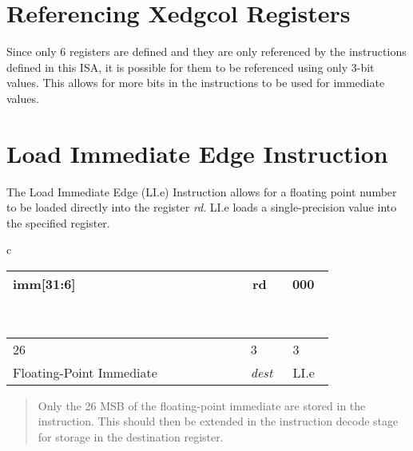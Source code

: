 \section{Referencing Xedgcol Registers}
Since only 6 registers are defined and they are only referenced by the instructions defined in this ISA, it is possible for them to be referenced using only 3-bit values. This allows for more bits in the instructions to be used for immediate values.

\section{Load Immediate Edge Instruction}
The Load Immediate Edge (LI.e) Instruction allows for a floating point number to be loaded directly into the register \textit{rd}. LI.e loads a single-precision value into the specified register.

\begin{table}[H]
\begin{centering}
\begin{tabular}{c}
    \begin{tabular}{|m{0.6\linewidth}|m{0.1\linewidth}|m{0.1\linewidth}|}
    \hline
    \hspace*{3.5cm} imm[31:6]  &  \hspace*{0.5cm}rd &  \hspace*{0.5cm}000 \\
    \hline
    \end{tabular} \\

    \begin{tabular}{m{0.6\linewidth}m{0.1\linewidth}m{0.1\linewidth}}
    \hspace*{3.85cm}  26 &  \hspace*{0.5cm} 3 &  \hspace*{0.5cm} 3 \\
    \hspace*{2.7cm}  Floating-Point Immediate &  \hspace*{0.4cm}\textit{dest} &  \hspace*{0.4cm}LI.e \\
    \end{tabular}
\end{tabular}
\end{centering}
\end{table}

\begin{quote}{}
    Only the 26 \gls{MSB} of the floating-point immediate are stored in the instruction. This should then be extended in the instruction decode stage for storage in the destination register.
\end{quote}

